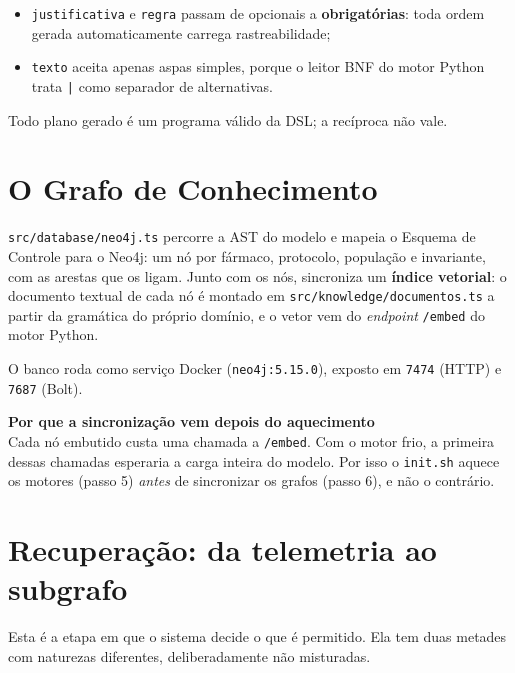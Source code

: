 \documentclass[11pt,a4paper]{article}
\newcommand{\aviso}[2]{%
  \begin{center}
  \begin{minipage}{0.95\linewidth}
  \setlength{\fboxsep}{8pt}%
  \colorbox{corAlertaFundo}{%
    \begin{minipage}{\dimexpr\linewidth-16pt\relax}
    \textbf{\textcolor{corAlerta}{#1}}\\[2pt]#2
    \end{minipage}}
  \end{minipage}
  \end{center}
}
\newcommand{\arq}[1]{\texttt{\small #1}}
\begin{document}
\begin{itemize}[leftmargin=*,itemsep=2pt]
\item \texttt{justificativa} e \texttt{regra} passam de opcionais a
\textbf{obrigatórias}: toda ordem gerada automaticamente carrega
rastreabilidade;
\item \texttt{texto} aceita apenas aspas simples, porque o leitor BNF do motor
Python trata \texttt{|} como separador de alternativas.
\end{itemize}

Todo plano gerado é um programa válido da DSL; a recíproca não vale.

\section{O Grafo de Conhecimento}

\arq{src/database/neo4j.ts} percorre a AST do modelo e mapeia o Esquema de
Controle para o Neo4j: um nó por fármaco, protocolo, população e invariante,
com as arestas que os ligam. Junto com os nós, sincroniza um \textbf{índice
vetorial}: o documento textual de cada nó é montado em
\arq{src/knowledge/documentos.ts} a partir da gramática do próprio domínio, e o
vetor vem do \emph{endpoint} \texttt{/embed} do motor Python.

O banco roda como serviço Docker (\texttt{neo4j:5.15.0}), exposto em
\texttt{7474} (HTTP) e \texttt{7687} (Bolt).

\aviso{Por que a sincronização vem depois do aquecimento}{%
Cada nó embutido custa uma chamada a \texttt{/embed}. Com o motor frio, a
primeira dessas chamadas esperaria a carga inteira do modelo. Por isso o
\arq{init.sh} aquece os motores (passo 5) \emph{antes} de sincronizar os grafos
(passo 6), e não o contrário.}

\section{Recuperação: da telemetria ao subgrafo}

Esta é a etapa em que o sistema decide o que é permitido. Ela tem duas metades
com naturezas diferentes, deliberadamente não misturadas.
\end{document}
